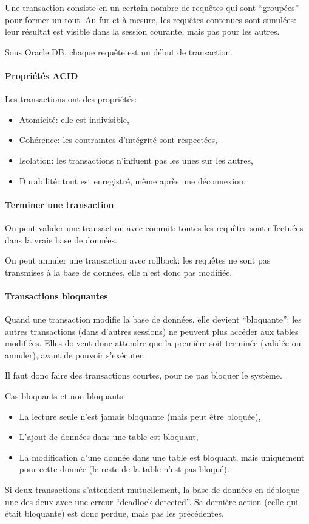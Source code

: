 \documentclass[10pt,a4paper,french]{article}
\begin{document}
Une transaction consiste en un certain nombre de requêtes qui sont ``groupées'' pour former un tout. Au fur et à mesure, les requêtes contenues sont simulées: leur résultat est visible dans la session courante, mais pas pour les autres.

Sous Oracle DB, chaque requête est un début de transaction.

\paragraph{Propriétés ACID}
Les transactions ont des propriétés:
\begin{itemize}
\item Atomicité: elle est indivisible,
\item Cohérence: les contraintes d'intégrité sont respectées,
\item Isolation: les transactions n'influent pas les unes sur les autres,
\item Durabilité: tout est enregistré, même après une déconnexion.
\end{itemize}

\paragraph{Terminer une transaction}
On peut valider une transaction avec \gls{commit}: toutes les requêtes sont effectuées dans la vraie base de données.

On peut annuler une transaction avec \gls{rollback}: les requêtes ne sont pas transmises à la base de données, elle n'est donc pas modifiée.

\paragraph{Transactions bloquantes}
Quand une transaction modifie la base de données, elle devient ``bloquante'': les autres transactions (dans d'autres sessions) ne peuvent plus accéder aux tables modifiées. Elles doivent donc attendre que la première soit terminée (validée ou annuler), avant de pouvoir s'exécuter.

Il faut donc faire des transactions courtes, pour ne pas bloquer le système.

Cas bloquants et non-bloquants:
\begin{itemize}
\item La lecture seule n'est jamais bloquante (mais peut être bloquée),
\item L'ajout de données dans une table est bloquant, \hfill {}
\item La modification d'une donnée dans une table est bloquant, mais uniquement pour cette donnée (le reste de la table n'est pas bloqué). \hfill {}
\end{itemize}
Si deux transactions s'attendent mutuellement, la base de données en débloque une des deux avec une erreur ``deadlock detected''. Sa dernière action (celle qui était bloquante) est donc perdue, mais pas les précédentes.
\end{document}
